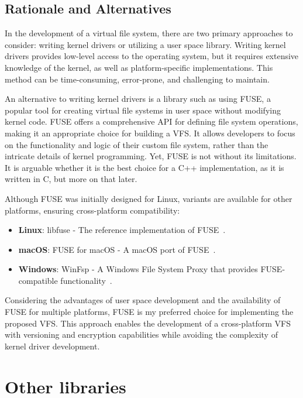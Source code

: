 \subsection{Rationale and Alternatives}\label{sec:fuse-analysis}

In the development of a virtual file system, there are two primary approaches to consider: writing kernel drivers or utilizing a user space library.
Writing kernel drivers provides low-level access to the operating system, but it requires extensive knowledge of the kernel, as well as platform-specific implementations.
This method can be time-consuming, error-prone, and challenging to maintain.

An alternative to writing kernel drivers is a library such as using FUSE, a popular tool for creating virtual file systems in user space without modifying kernel code.
FUSE offers a comprehensive API for defining file system operations, making it an appropriate choice for building a VFS\@.
It allows developers to focus on the functionality and logic of their custom file system, rather than the intricate details of kernel programming.
Yet, FUSE is not without its limitations.
It is arguable whether it is the best choice for a C++ implementation, as it is written in C, but more on that later.

Although FUSE was initially designed for Linux, variants are available for other platforms, ensuring cross-platform compatibility:

\begin{itemize}
    \item \textbf{Linux}: libfuse - The reference implementation of FUSE~\cite{libfuse}.
    \item \textbf{macOS}: FUSE for macOS - A macOS port of FUSE~\cite{osxfuse}.
    \item \textbf{Windows}: WinFsp - A Windows File System Proxy that provides FUSE-compatible functionality~\cite{winfsp}.
\end{itemize}

Considering the advantages of user space development and the availability of FUSE for multiple platforms, FUSE is my preferred choice for implementing the proposed VFS\@.
This approach enables the development of a cross-platform VFS with versioning and encryption capabilities while avoiding the complexity of kernel driver development.

\section{Other libraries}\label{sec:other-libraries-analysis}

